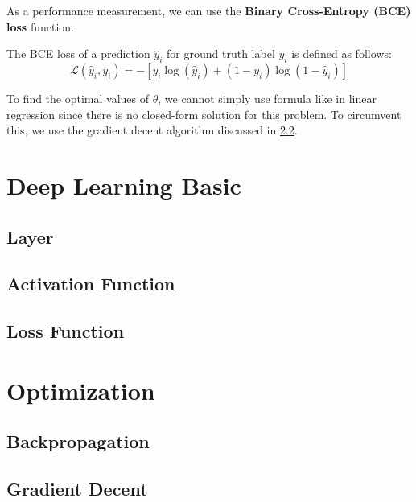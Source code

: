 \documentclass[10pt]{article}
\begin{document}
As a performance measurement, we can use the \textbf{Binary 
Cross-Entropy (BCE) loss} function.

\begin{definition}
    The BCE loss of a prediction $\hat{y}_i$ for ground truth label $y_i$ 
    is defined as follows:
    \begin{equation*}
        \mathcal{L}(\hat{y}_i, y_i) = - \left[ y_i \log(\hat{y}_i) + (1 - y_i) \log(1 - \hat{y}_i) \right]
    \end{equation*}
\end{definition}

To find the optimal values of $\theta$, we cannot simply use formula 
like in linear regression since there is no closed-form solution 
for this problem. To circumvent this, we use the gradient decent 
algorithm discussed in \cref{sec:optimization:sub:gradientdecent}.


\section{Deep Learning Basic}


\subsection{Layer}

\subsection{Activation Function}

\subsection{Loss Function}

\section{Optimization}

\subsection{Backpropagation}

\subsection{Gradient Decent}
\label{sec:optimization:sub:gradientdecent}
\end{document}

